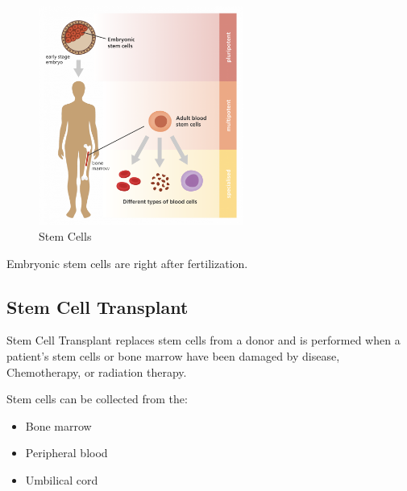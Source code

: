 \documentclass[12pt]{report}
\begin{document}
\begin{figure}[H]
\centering
    \includegraphics[width=0.6\textwidth]{../figures/stem cells.png}
    \caption{Stem Cells}
    \label{fig:stem-cells}
\end{figure}

\begin{note}{ }
    Embryonic stem cells are right after fertilization.
\end{note}

\subsection{Stem Cell Transplant}
\begin{definition}
    Stem Cell Transplant replaces stem cells from a donor and is performed when a patient's stem cells or bone marrow have been damaged by disease, Chemotherapy, or radiation therapy. 
\end{definition}

Stem cells can be collected from the: 
\begin{itemize}
    \item{Bone marrow}
    \item{Peripheral blood}
    \item{Umbilical cord}
\end{itemize}
\end{document}
